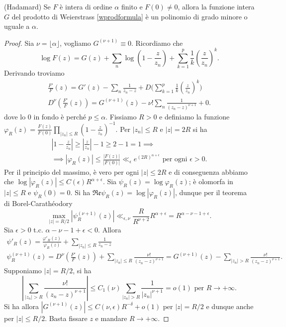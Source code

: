 \begin{thm} \label{hadamard}
  (Hadamard) Se $F$ è intera di ordine $\alpha$ finito e $F(0)\not=0$, allora la funzione intera $G$ del prodotto di Weierstrass \eqref{wprodformula} è un polinomio di grado minore o uguale a $\alpha$.
\end{thm}

\begin{proof}
  Sia $\nu=\lfloor\alpha\rfloor$, vogliamo $G^{(\nu+1)}\equiv 0$. Ricordiamo che
  $$\log{F(z)}=G(z)+\sum_n \log\left(1-\frac{z}{z_n}\right)+\sum_{k=1}^p \frac{1}{k}\left(\frac{z}{z_n}\right)^k.$$
  Derivando troviamo
  \begin{gather*}
    \frac{F'}{F}(z)=G'(z)-\sum_n \frac{1}{z_n-z}+D\Bigg(\sum_{k=1}^p \frac{1}{k}\left(\frac{z}{z_n}\right)^k\Bigg) \\
    D^{\nu}\left(\frac{F'}{F}(z)\right)=G^{(\nu+1)}(z)-\nu!\sum_n \frac{1}{(z_n-z)^{\nu+1}}+0.
  \end{gather*}
  dove lo $0$ in fondo è perché $p \le \alpha$. Fissiamo $R>0$ e definiamo la funzione $\displaystyle \varphi_R(z)=\frac{F(z)}{F(0)}\prod_{|z_n| \le R} \left(1-\frac{z}{z_n}\right)^{-1}$.
  Per $|z_n| \le R$ e $|z|=2R$ si ha
  \begin{gather*}
    \left|1-\frac{z}{z_n}\right| \ge \left|\frac{z}{z_n}\right|-1 \ge 2-1=1 \implies \\
    \implies |\varphi_R(z)| \le \frac{|F(z)|}{|F(0)|} \ll_{\epsilon} e^{(2R)^{\alpha+\epsilon}} \text{ per ogni } \epsilon>0.
  \end{gather*}
  Per il principio del massimo, è vero per ogni $|z| \le 2R$ e di conseguenza abbiamo che $\log{|\varphi_R(z)|} \le C(\epsilon)R^{\alpha+\epsilon}$. Sia $\psi_R(z)=\log{\varphi_R(z)}$; è olomorfa in $|z| \le R$ e $\psi_R(0)=0$. Si ha $\mathfrak{Re}\psi_R(z)=\log{|\varphi_R(z)|}$, dunque per il teorema di Borel-Carathéodory
  $$\max_{|z|=R/2}|\psi_R^{(\nu+1)}(z)| \ll_{\epsilon,\nu} \frac{R}{R^{\nu+2}}R^{\alpha+\epsilon}=R^{\alpha-\nu-1+\epsilon}.$$
  Sia $\epsilon>0$ t.c. $\alpha-\nu-1+\epsilon<0$. Allora
  \begin{gather*}
    \psi'_R(z)=\frac{\varphi'_R(z)}{\varphi_R(z)}+\sum_{|z_n| \le R} \frac{1}{z_n-z} \\
    \psi_R^{(\nu+1)}(z)=D^{\nu}\left(\frac{F'}{F}(z)\right)+\sum_{|z_n| \le R} \frac{\nu!}{(z_n-z)^{\nu+1}}=G^{(\nu+1)}(z)-\sum_{|z_n|>R} \frac{\nu!}{(z_n-z)^{\nu+1}}.
  \end{gather*}
  Supponiamo $|z|=R/2$, si ha
  $$\left|\sum_{|z_n|>R} \frac{\nu!}{(z_n-z)^{\nu+1}}\right| \le C_1(\nu) \sum_{|z_n|>R} \frac{1}{|z_n|^{\nu+1}}=o(1) \text{ per } R \longrightarrow +\infty.$$
  Si ha allora $|G^{(\nu+1)}(z)| \le C(\nu,\epsilon)R^{-\delta}+o(1)$ per $|z|=R/2$ e dunque anche per $|z| \le R/2$. Basta fissare $z$ e mandare $R \longrightarrow +\infty$.
\end{proof}

